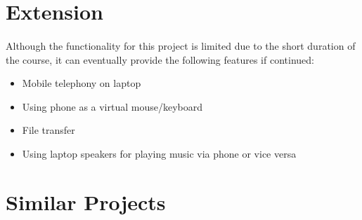 \documentclass[12pt, letterpaper, titlepage]{article}
\begin{document}
\section{Extension}

    \paragraph{}
    Although the functionality for this project is limited due to the short
    duration of the course, it can eventually provide the following features if
    continued:
    \begin{itemize}
        \item{Mobile telephony on laptop}
        \item{Using phone as a virtual mouse/keyboard}
        \item{File transfer}
        \item{Using laptop speakers for playing music via phone or vice versa}
    \end{itemize}


\newpage
\section{Similar Projects}
\end{document}
